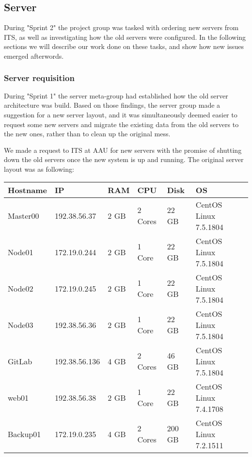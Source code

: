 \subsection{Server}\label{SEC:S2ServerWork}
During "Sprint 2" the project group was tasked with ordering new servers from ITS, as well as investigating how the old servers were configured.
In the following sections we will describe our work done on these tasks, and show how new issues emerged afterwords.

\subsubsection{Server requisition}
During "Sprint 1" the server meta-group had established how the old server architecture was build.
Based on those findings, the server group made a suggestion for a new server layout, and it was simultaneously deemed easier to request some new servers and migrate the existing data from the old servers to the new ones, rather than to clean up the original mess.

We made a request to ITS at AAU for new servers with the promise of shutting down the old servers once the new system is up and running. The original server layout was as following:

\begin{table}[H]

\begin{tabular}{|l|l|l|l|l|l|}
\hline
Hostname & IP 			& RAM 	& CPU 		& Disk 	& OS 					\\ \hline
Master00 & 192.38.56.37 	& 2 GB 	& 2 Cores 	& 22 GB 	& CentOS Linux 7.5.1804 	\\ \hline
Node01 	& 172.19.0.244 	& 2 GB 	& 1 Core 	& 22 GB 	& CentOS Linux 7.5.1804 	\\ \hline
Node02	& 172.19.0.245	& 2 GB	& 1 Core		& 22 GB	& CentOS Linux 7.5.1804	\\ \hline
Node03	& 192.38.56.36	& 2 GB	& 1 Core 	& 22 GB	& CentOS Linux 7.5.1804 	\\ \hline
GitLab 	& 192.38.56.136	& 4 GB	& 2 Cores 	& 46 GB 	& CentOS Linux 7.5.1804 	\\ \hline
web01	& 192.38.56.38	& 2 GB	& 1 Core		& 22 GB 	& CentOS Linux 7.4.1708 	\\ \hline
Backup01	& 172.19.0.235	& 4 GB	& 2 Cores	& 200 GB & CentOS Linux 7.2.1511 	\\ \hline
\end{tabular}
\end{table}

